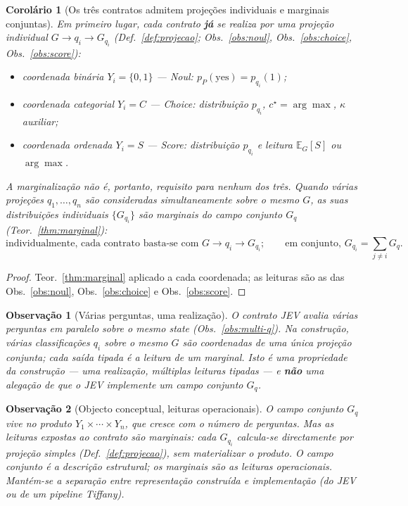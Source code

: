 \documentclass[11pt,a4paper]{article}
\newtheorem{observacao}{Observação}
\newtheorem{corolario}{Corolário}
\begin{document}
\begin{corolario}[Os três contratos admitem projeções individuais e marginais conjuntas]
\label{cor:marginais}
Em primeiro lugar, cada contrato \textbf{já} se realiza por uma projeção
\emph{individual} \(G\to q_i\to G_{q_i}\) (Def.~\ref{def:projecao};
Obs.~\ref{obs:noul}, Obs.~\ref{obs:choice}, Obs.~\ref{obs:score}):
\begin{itemize}[leftmargin=1.5em]
\item coordenada binária \(Y_i=\{0,1\}\) --- Noul: \(p_P(\mathrm{yes})=p_{q_i}(1)\);
\item coordenada categorial \(Y_i=C\) --- Choice: distribuição \(p_{q_i}\),
\(c^\star=\arg\max\), \(\kappa\) auxiliar;
\item coordenada ordenada \(Y_i=S\) --- Score: distribuição \(p_{q_i}\) e
leitura \(\mathbb E_G[S]\) ou \(\arg\max\).
\end{itemize}
A marginalização não é, portanto, requisito para nenhum dos três. Quando várias
projeções \(q_1,\dots,q_n\) são consideradas \emph{simultaneamente} sobre o
mesmo \(G\), as suas distribuições individuais \(\{G_{q_i}\}\) são marginais do
campo conjunto \(G_q\) (Teor.~\ref{thm:marginal}):
\[
\boxed{
\text{individualmente, cada contrato basta-se com }G\to q_i\to G_{q_i};
}
\qquad
\boxed{
\text{em conjunto, }G_{q_i}=\sum_{j\neq i}G_q.
}
\]
\end{corolario}

\begin{proof}
Teor.~\ref{thm:marginal} aplicado a cada coordenada; as leituras são as das
Obs.~\ref{obs:noul}, Obs.~\ref{obs:choice} e Obs.~\ref{obs:score}.
\end{proof}

\begin{observacao}[Várias perguntas, uma realização]
\label{obs:multi-q-marg}
O contrato JEV avalia várias perguntas em paralelo sobre o mesmo
\textit{state} (Obs.~\ref{obs:multi-q}). Na construção, várias classificações
\(q_i\) sobre o mesmo \(G\) são coordenadas de uma única projeção conjunta;
cada saída tipada é a leitura de um marginal. Isto é uma propriedade da
construção --- \emph{uma realização, múltiplas leituras tipadas} --- e
\textbf{não} uma alegação de que o JEV implemente um campo conjunto \(G_q\).
\end{observacao}

\begin{observacao}[Objecto conceptual, leituras operacionais]
\label{obs:conjunta-itens}
O campo conjunto \(G_q\) vive no produto \(Y_1\times\cdots\times Y_n\), que
cresce com o número de perguntas. Mas as leituras expostas ao contrato são
\emph{marginais}: cada \(G_{q_i}\) calcula-se directamente por projeção simples
(Def.~\ref{def:projecao}), sem materializar o produto. O campo conjunto é a
descrição estrutural; os marginais são as leituras operacionais. Mantém-se a
separação entre representação construída e implementação (do JEV ou de um
pipeline Tiffany).
\end{observacao}
\end{document}

